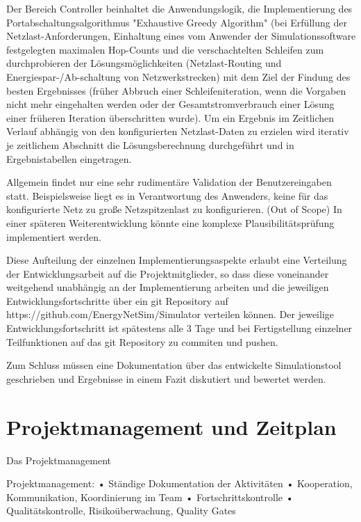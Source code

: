 \documentclass[12pt,titlepage]{article}
\begin{document}
Der Bereich Controller beinhaltet die Anwendungslogik, die Implementierung des Portabschaltungsalgorithmus "Exhaustive Greedy Algorithm" (bei Erfüllung der Netzlast-Anforderungen, Einhaltung eines vom Anwender der Simulationssoftware festgelegten maximalen Hop-Counts und die verschachtelten Schleifen zum durchprobieren der Lösungs\-möglich\-keiten (Netzlast-Routing und Energiespar-/Ab-schaltung von Netzwerkstrecken) mit dem Ziel der Findung des besten Ergebnisses (früher Abbruch einer Schleifeniteration, wenn die Vorgaben nicht mehr eingehalten werden oder der Gesamtstromverbrauch einer Lösung einer früheren Iteration überschritten wurde). Um ein Ergebnis im Zeitlichen Verlauf abhängig von den konfigurierten Netzlast-Daten zu erzielen wird iterativ je zeitlichem Abschnitt die Lösungsberechnung durchgeführt und in Ergebnistabellen eingetragen.
 
Allgemein findet nur eine sehr rudimentäre Validation der Benutzereingaben statt. Beispielsweise liegt es in Verantwortung des Anwenders, keine für das konfigurierte Netz zu große Netzspitzenlast zu konfigurieren. (Out of Scope) In einer späteren Weiterentwicklung könnte eine komplexe Plausibilitätsprüfung implementiert werden.
 
Diese Aufteilung der einzelnen Implementierungsaspekte erlaubt eine Verteilung der Entwicklungsarbeit auf die Projektmitglieder, so dass diese voneinander weitgehend unabhängig an der Implementierung arbeiten und die jeweiligen Entwicklungsfortschritte über ein git Repository auf https://github.com/EnergyNetSim/Simulator verteilen können. Der jeweilige Entwicklungsfortschritt ist spätestens alle 3 Tage und bei Fertigstellung einzelner Teilfunktionen auf das git Repository zu commiten und pushen.
 
Zum Schluss müssen eine Dokumentation über das entwickelte Simulationstool geschrieben und Ergebnisse in einem Fazit diskutiert und bewertet werden. 
 
 




\section{Projektmanagement und Zeitplan}
Das Projektmanagement

 
 
Projektmanagement:
•	Ständige Dokumentation der Aktivitäten
•	Kooperation, Kommunikation, Koordinierung im Team
•	Fortschrittskontrolle
•	Qualitätskontrolle, Risikoüberwachung, Quality Gates
 
\end{document}
